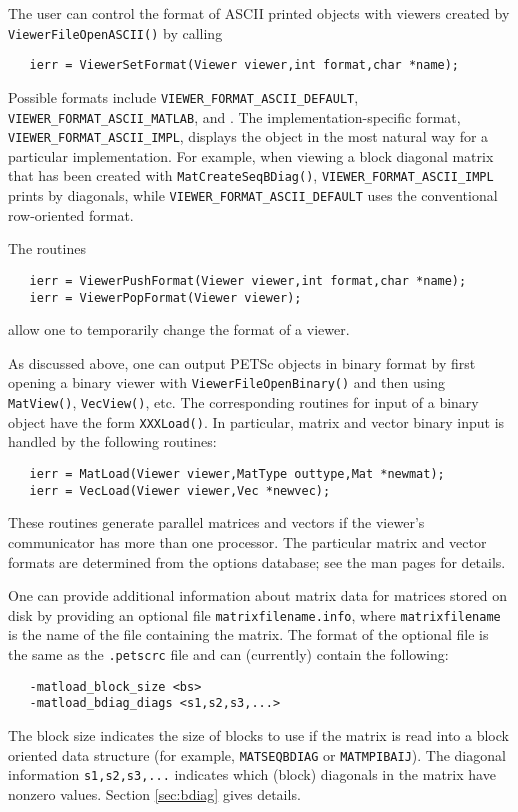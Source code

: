 The user can control the format of ASCII printed objects with viewers 
created by {\tt ViewerFileOpenASCII()} by calling
\begin{verbatim}
   ierr = ViewerSetFormat(Viewer viewer,int format,char *name);
\end{verbatim}  
  
 
Possible formats include 
{\tt VIEWER\_FORMAT\_ASCII\_DEFAULT}, {\tt VIEWER\_FORMAT\_ASCII\_MATLAB}, and
.  The implementation-specific format, 
{\tt VIEWER\_FORMAT\_ASCII\_IMPL}, displays the object in the most natural way
for a particular implementation.  For example, when viewing a block 
diagonal matrix that has been created with {\tt MatCreateSeqBDiag()},
{\tt VIEWER\_FORMAT\_ASCII\_IMPL} prints by diagonals, while {\tt VIEWER\_FORMAT\_ASCII\_DEFAULT}
uses the conventional row-oriented format.

The routines
\begin{verbatim}
   ierr = ViewerPushFormat(Viewer viewer,int format,char *name);
   ierr = ViewerPopFormat(Viewer viewer);
\end{verbatim} 
allow one to temporarily change the format of a viewer.
 

As discussed above, one can output PETSc objects in binary format by
first opening a binary viewer with {\tt ViewerFileOpenBinary()} and
then using {\tt MatView()}, {\tt VecView()}, etc.  The corresponding
routines for input of a binary object have the form {\tt XXXLoad()}.  In
particular, matrix and vector binary input is handled by the
following routines:  
\begin{verbatim}
   ierr = MatLoad(Viewer viewer,MatType outtype,Mat *newmat);
   ierr = VecLoad(Viewer viewer,Vec *newvec);
\end{verbatim}
These routines generate parallel matrices and vectors if the viewer's
communicator has more than one processor.  The particular matrix and
vector formats are determined from the options database; see the
man pages for details.

One can provide additional information about matrix data for matrices
stored on disk by providing an optional file {\tt matrixfilename.info},
where {\tt matrixfilename} is the name of the file containing the matrix.
The format of the optional file is the same as the {\tt .petscrc} file 
and can (currently) contain the following:
\begin{verbatim}
   -matload_block_size <bs>
   -matload_bdiag_diags <s1,s2,s3,...>
\end{verbatim}
The block size indicates the size of blocks to use if the matrix is
read into a block oriented data structure (for example, 
{\tt MATSEQBDIAG} or {\tt MATMPIBAIJ}). The diagonal information 
{\tt s1,s2,s3,...} indicates
which (block) diagonals in the matrix have nonzero values.
Section \ref{sec:bdiag} gives details.

